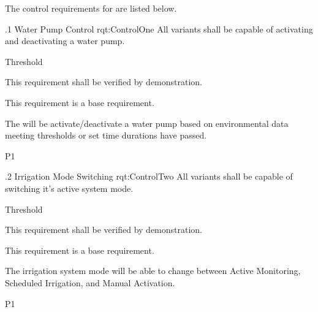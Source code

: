 The control requirements for \ThisSystem are listed below.

\ONERQMTVKPP
{\RqtNumberBase.1}
{Water Pump Control}
{rqt:ControlOne}
{All \ThisSys variants shall be capable of activating and deactivating a water pump.}
{
	\item [All Phases] Threshold
}
{This requirement shall be verified by demonstration.}
{
	\item [N/A] This requirement is a base requirement.
}
{
  \item The \ThisSystem will be activate/deactivate a water pump based on environmental data meeting thresholds or set time durations have passed.
}
{P1}

\ONERQMTVKPP
{\RqtNumberBase.2}
{Irrigation Mode Switching}
{rqt:ControlTwo}
{All \ThisSys variants shall be capable of switching it's active system mode.}
{
	\item [All Phases] Threshold
}
{This requirement shall be verified by demonstration.}
{
	\item [N/A] This requirement is a base requirement.
}
{
  \item The irrigation system mode will be able to change between Active Monitoring, Scheduled Irrigation, and Manual Activation.
}
{P1}
